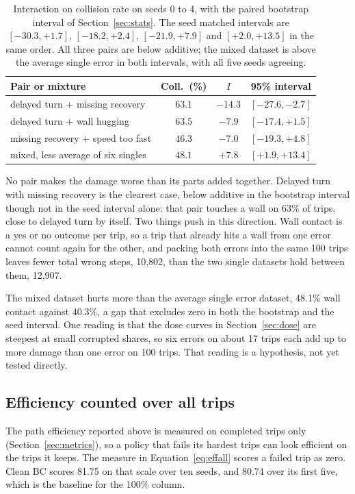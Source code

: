 \documentclass[conference]{IEEEtran}
\begin{document}
\begin{table}[tbp]
\centering\footnotesize
\begin{tabular}{@{}lccc@{}}
\toprule
Pair or mixture & Coll.\ (\%) & $I$ & 95\% interval\\
\midrule
delayed turn + missing recovery & $63.1$ & $-14.3$ & $[-27.6,-2.7]$\\
delayed turn + wall hugging & $63.5$ & $-7.9$ & $[-17.4,+1.5]$\\
missing recovery + speed too fast & $46.3$ & $-7.0$ & $[-19.3,+4.8]$\\
mixed, less average of six singles & $48.1$ & $+7.8$ & $[+1.9,+13.4]$\\
\bottomrule
\end{tabular}
\caption{Interaction on collision rate on seeds 0 to 4, with the paired bootstrap interval of
Section~\ref{sec:stats}. The seed matched intervals are $[-30.3,+1.7]$, $[-18.2,+2.4]$, $[-21.9,+7.9]$ and $[+2.0,+13.5]$ in the same order. All
three pairs are below additive; the mixed dataset is above the average single error in both intervals, with all
five seeds agreeing.}
\label{tab:pairs}
\end{table}

No pair makes the damage worse than its parts added together. Delayed turn with missing recovery is the clearest
case, below additive in the bootstrap interval though not in the seed interval alone: that pair touches a wall on
63\% of trips, close to delayed turn by itself. Two things push in this direction. Wall contact is a yes or no
outcome per trip, so a trip that already hits a wall from one error cannot count again for the other, and packing
both errors into the same 100 trips leaves fewer total wrong steps, 10{,}802, than the two single datasets hold
between them, 12{,}907.

The mixed dataset hurts more than the average single error dataset, 48.1\% wall contact against 40.3\%, a gap
that excludes zero in both the bootstrap and the seed interval. One reading is that the dose curves in
Section~\ref{sec:dose} are steepest at small corrupted shares, so six errors on about 17 trips each add up to
more damage than one error on 100 trips. That reading is a hypothesis, not yet tested directly.

\subsection{Efficiency counted over all trips}
The path efficiency reported above is measured on completed trips only (Section~\ref{sec:metrics}), so a policy
that fails its hardest trips can look efficient on the trips it keeps. The measure in
Equation~\eqref{eq:effall} scores a failed trip as zero. Clean BC scores 81.75 on that scale over ten seeds, and
80.74 over its first five, which is the baseline for the 100\% column.
\end{document}
